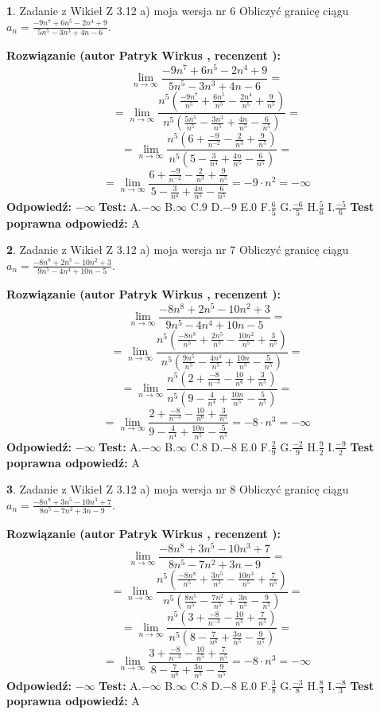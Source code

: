\documentclass[12pt, a4paper]{article}
\theoremstyle{definition} %
\newtheorem{zad}{}
\newcommand{\zadStart}[1]{\begin{zad}#1\newline}
\newcommand{\zadStop}{\end{zad}}
\newcommand{\rozwStart}[2]{\noindent \textbf{Rozwiązanie (autor #1 , recenzent #2): }\newline}
\newcommand{\rozwStop}{\newline}
\newcommand{\odpStart}{\noindent \textbf{Odpowiedź:}\newline}
\newcommand{\odpStop}{\newline}
\newcommand{\testStart}{\noindent \textbf{Test:}\newline}
\newcommand{\testStop}{\newline}
\newcommand{\kluczStart}{\noindent \textbf{Test poprawna odpowiedź:}\newline}
\newcommand{\kluczStop}{\newline}
\begin{document}
\zadStart{Zadanie z Wikieł Z 3.12 a) moja wersja nr 6}
Obliczyć granicę ciągu $a_{n}=\frac{-9n^{7}+6n^{5}-2n^{4}+9}{5n^{5}-3n^{3}+4n-6}$.
\zadStop
\rozwStart{Patryk Wirkus}{}
$$\lim\limits_{n\to\infty}\frac{-9n^{7}+6n^{5}-2n^{4}+9}{5n^{5}-3n^{3}+4n-6}=$$
$$=\lim\limits_{n\to\infty}\frac{n^{5}\left(\frac{-9n^{7}}{n^{5}}+\frac{6n^{5}}{n^{5}}-\frac{2n^{4}}{n^{5}}+\frac{9}{n^{5}}\right)}{n^{5}\left(\frac{5n^{5}}{n^{5}}-\frac{3n^{3}}{n^{5}}+\frac{4n}{n^{5}}-\frac{6}{n^{5}}\right)}=$$
$$=\lim\limits_{n\to\infty}\frac{n^{5}\left(6+\frac{-9}{n^{-2}}-\frac{2}{n^{3}}+\frac{9}{n^{5}}\right)}
{n^{5}\left(5-\frac{3}{n^{4}}+\frac{4n}{n^{5}}-\frac{6}{n^{5}}\right)}=$$
$$=\lim\limits_{n\to\infty}\frac{6+\frac{-9}{n^{-2}}-\frac{2}{n^{3}}+\frac{9}{n^{5}}}{5-\frac{3}{n^{4}}+\frac{4n}{n^{5}}-\frac{6}{n^{5}}}=-9\cdot n^{2} = -\infty$$
\rozwStop
\odpStart
$-\infty$
\odpStop
\testStart
A.$-\infty$
B.$\infty$
C.$9$
D.$-9$
E.$0$
F.$\frac{6}{5}$
G.$\frac{-6}{5}$
H.$\frac{5}{6}$
I.$\frac{-5}{6}$
\testStop
\kluczStart
A
\kluczStop



\zadStart{Zadanie z Wikieł Z 3.12 a) moja wersja nr 7}
Obliczyć granicę ciągu $a_{n}=\frac{-8n^{8}+2n^{5}-10n^{2}+3}{9n^{5}-4n^{4}+10n-5}$.
\zadStop
\rozwStart{Patryk Wirkus}{}
$$\lim\limits_{n\to\infty}\frac{-8n^{8}+2n^{5}-10n^{2}+3}{9n^{5}-4n^{4}+10n-5}=$$
$$=\lim\limits_{n\to\infty}\frac{n^{5}\left(\frac{-8n^{8}}{n^{5}}+\frac{2n^{5}}{n^{5}}-\frac{10n^{2}}{n^{5}}+\frac{3}{n^{5}}\right)}{n^{5}\left(\frac{9n^{5}}{n^{5}}-\frac{4n^{4}}{n^{5}}+\frac{10n}{n^{5}}-\frac{5}{n^{5}}\right)}=$$
$$=\lim\limits_{n\to\infty}\frac{n^{5}\left(2+\frac{-8}{n^{-3}}-\frac{10}{n^{6}}+\frac{3}{n^{5}}\right)}
{n^{5}\left(9-\frac{4}{n^{4}}+\frac{10n}{n^{5}}-\frac{5}{n^{5}}\right)}=$$
$$=\lim\limits_{n\to\infty}\frac{2+\frac{-8}{n^{-3}}-\frac{10}{n^{6}}+\frac{3}{n^{5}}}{9-\frac{4}{n^{4}}+\frac{10n}{n^{5}}-\frac{5}{n^{5}}}=-8\cdot n^{3} = -\infty$$
\rozwStop
\odpStart
$-\infty$
\odpStop
\testStart
A.$-\infty$
B.$\infty$
C.$8$
D.$-8$
E.$0$
F.$\frac{2}{9}$
G.$\frac{-2}{9}$
H.$\frac{9}{2}$
I.$\frac{-9}{2}$
\testStop
\kluczStart
A
\kluczStop



\zadStart{Zadanie z Wikieł Z 3.12 a) moja wersja nr 8}
Obliczyć granicę ciągu $a_{n}=\frac{-8n^{8}+3n^{5}-10n^{3}+7}{8n^{5}-7n^{2}+3n-9}$.
\zadStop
\rozwStart{Patryk Wirkus}{}
$$\lim\limits_{n\to\infty}\frac{-8n^{8}+3n^{5}-10n^{3}+7}{8n^{5}-7n^{2}+3n-9}=$$
$$=\lim\limits_{n\to\infty}\frac{n^{5}\left(\frac{-8n^{8}}{n^{5}}+\frac{3n^{5}}{n^{5}}-\frac{10n^{3}}{n^{5}}+\frac{7}{n^{5}}\right)}{n^{5}\left(\frac{8n^{5}}{n^{5}}-\frac{7n^{2}}{n^{5}}+\frac{3n}{n^{5}}-\frac{9}{n^{5}}\right)}=$$
$$=\lim\limits_{n\to\infty}\frac{n^{5}\left(3+\frac{-8}{n^{-3}}-\frac{10}{n^{5}}+\frac{7}{n^{5}}\right)}
{n^{5}\left(8-\frac{7}{n^{6}}+\frac{3n}{n^{5}}-\frac{9}{n^{5}}\right)}=$$
$$=\lim\limits_{n\to\infty}\frac{3+\frac{-8}{n^{-3}}-\frac{10}{n^{5}}+\frac{7}{n^{5}}}{8-\frac{7}{n^{6}}+\frac{3n}{n^{5}}-\frac{9}{n^{5}}}=-8\cdot n^{3} = -\infty$$
\rozwStop
\odpStart
$-\infty$
\odpStop
\testStart
A.$-\infty$
B.$\infty$
C.$8$
D.$-8$
E.$0$
F.$\frac{3}{8}$
G.$\frac{-3}{8}$
H.$\frac{8}{3}$
I.$\frac{-8}{3}$
\testStop
\kluczStart
A
\kluczStop
\end{document}
